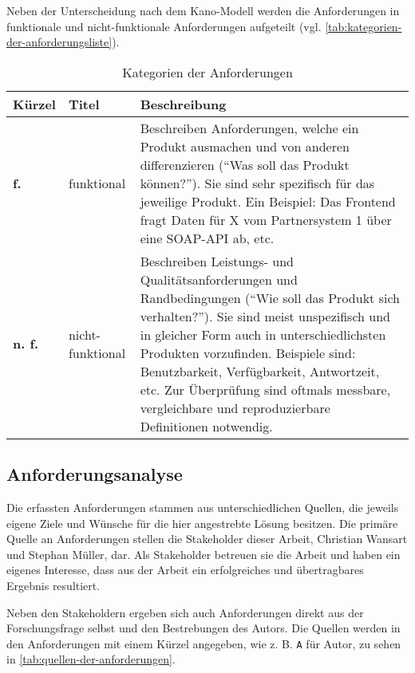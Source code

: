 Neben der Unterscheidung nach dem Kano-Modell werden die Anforderungen in funktionale und nicht-funktionale Anforderungen \cite{FunktionaleUndNichtFunktionaleAnforderungen} aufgeteilt (vgl. \autoref{tab:kategorien-der-anforderungsliste}).

\begin{table}[H]
\begin{tabular}{ |p{1.15cm}|p{2.75cm}|p{9.6cm}| }
	\hline
	Kürzel & Titel & Beschreibung \\
	\hline
	\textbf{f.} & funktional & Beschreiben Anforderungen, welche ein Produkt ausmachen und von anderen differenzieren (\enquote{Was soll das Produkt können?}). Sie sind sehr spezifisch für das jeweilige Produkt. Ein Beispiel: Das Frontend fragt Daten für X vom Partnersystem 1 über eine SOAP-API ab, etc.\\
	\hline
	\textbf{n. f.} & nicht-funktional & Beschreiben Leistungs- und Qualitätsanforderungen und Randbedingungen (\enquote{Wie soll das Produkt sich verhalten?}). Sie sind meist unspezifisch und in gleicher Form auch in unterschiedlichsten Produkten vorzufinden. Beispiele sind: Benutzbarkeit, Verfügbarkeit, Antwortzeit, etc. Zur Überprüfung sind oftmals messbare, vergleichbare und reproduzierbare Definitionen notwendig. \\
	\hline
\end{tabular}
 \captionsetup{justification=centering}
  \caption{Kategorien der Anforderungen \cite{FunktionaleUndNichtFunktionaleAnforderungen}}
   \label{tab:kategorien-der-anforderungsliste}
\end{table}
	
\subsection{Anforderungsanalyse}

Die erfassten Anforderungen stammen aus unterschiedlichen Quellen, die jeweils eigene Ziele und Wünsche für die hier angestrebte Lösung besitzen. Die primäre Quelle an Anforderungen stellen die Stakeholder dieser Arbeit, Christian Wansart und Stephan Müller, dar. Als Stakeholder betreuen sie die Arbeit und haben ein eigenes Interesse, dass aus der Arbeit ein erfolgreiches und übertragbares Ergebnis resultiert.

Neben den Stakeholdern ergeben sich auch Anforderungen direkt aus der Forschungsfrage selbst und den Bestrebungen des Autors. Die Quellen werden in den Anforderungen mit einem Kürzel angegeben, wie z. B. \texttt{A} für Autor, zu sehen in \autoref{tab:quellen-der-anforderungen}.

